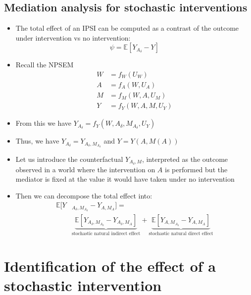 \documentclass[
  12pt,
]{book}
\providecommand{\tightlist}{%
  \setlength{\itemsep}{0pt}\setlength{\parskip}{0pt}}
\theoremstyle{definition}
\theoremstyle{definition}
\theoremstyle{definition}
\newcommand{\E}{\mathbb{E}}
\newcommand{\1}{\mathbbm{1}}
\begin{document}
\hypertarget{mediation-analysis-for-stochastic-interventions}{%
\subsection{Mediation analysis for stochastic interventions}\label{mediation-analysis-for-stochastic-interventions}}

\begin{itemize}
\tightlist
\item
  The total effect of an IPSI can be computed as a contrast of the outcome under
  intervention vs no intervention:
  \begin{equation*}
    \psi = \E[Y_{A_\delta} - Y]
  \end{equation*}
\item
  Recall the NPSEM
  \begin{align}
    W & = f_W(U_W)\\
    A & = f_A(W, U_A)\\
    M & = f_M(W, A, U_M)\\
    Y & = f_Y(W, A, M, U_Y)
  \end{align}
\item
  From this we have \(Y_{A_\delta} = f_Y(W, A_\delta, M_{A_\delta}, U_Y)\)
\item
  Thus, we have \(Y_{A_\delta} = Y_{A_\delta, M_{A_\delta}}\) and \(Y = Y(A,M(A))\)
\item
  Let us introduce the counterfactual \(Y_{A_\delta,M}\), interpreted as the
  outcome observed in a world where the intervention on \(A\) is performed but the
  mediator is fixed at the value it would have taken under no intervention
\item
  Then we can decompose the total effect into:
  \begin{align*}
    \E[Y&_{A_\delta,M_{A_\delta}} - Y_{A,M_A}] = \\
    &\underbrace{\E[Y_{A_\delta,M_{A_\delta}} -
      Y_{A_\delta,M_A}]}_{\text{stochastic natural indirect effect}} +
      \underbrace{\E[Y_{A,M_{A_\delta}} -
      Y_{A,M_A}]}_{\text{stochastic natural direct effect}}
  \end{align*}
\end{itemize}

\hypertarget{identification-of-the-effect-of-a-stochastic-intervention}{%
\section{Identification of the effect of a stochastic intervention}\label{identification-of-the-effect-of-a-stochastic-intervention}}
\end{document}
